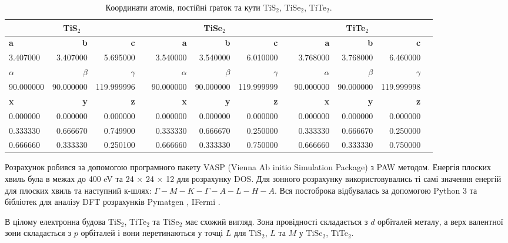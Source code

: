 \begin{table}[!htp]\centering

\scriptsize
\begin{tabular}{lrrrrrrrrrrr}\toprule
\multicolumn{3}{c}{\textbf{TiS$_2$}} & &\multicolumn{3}{c}{\textbf{TiSe$_2$}} & &\multicolumn{3}{c}{\textbf{TiTe$_2$}} \\\midrule
\textbf{a} &\textbf{b} &\textbf{c} & &\textbf{a} &\textbf{b} &\textbf{c} & &\textbf{a} &\textbf{b} &\textbf{c} \\
3.407000 &3.407000 &5.695000 & &3.540000 &3.540000 &6.010000 & &3.768000 &3.768000 &6.460000 \\
\textbf{$\alpha$} &\textbf{$\beta$} &\textbf{$\gamma$} & &\textbf{$\alpha$} &\textbf{$\beta$} &\textbf{$\gamma$} & &\textbf{$\alpha$} &\textbf{$\beta$} &\textbf{$\gamma$} \\
90.000000 &90.000000 &119.999996 & &90.000000 &90.000000 &119.999999 & &90.000000 &90.000000 &119.999998 \\
\textbf{x} &\textbf{y} &\textbf{z} & &\textbf{x} &\textbf{y} &\textbf{z} & &\textbf{x} &\textbf{y} &\textbf{z} \\
0.000000 &0.000000 &0.000000 & &0.000000 &0.000000 &0.000000 & &0.000000 &0.000000 &0.000000 \\
0.333330 &0.666670 &0.749900 & &0.333330 &0.666670 &0.250000 & &0.333330 &0.666670 &0.250000 \\
0.666660 &0.333330 &0.250100 & &0.666660 &0.333330 &0.750000 & &0.666660 &0.333330 &0.750000 \\
\bottomrule
\end{tabular}
\caption{Координати атомів, постійні ґраток та кути TiS$_2$, TiSe$_2$, TiTe$_2$.}\label{tab:Structure}
\end{table}

Розрахунок робився за допомогою програмного пакету VASP (Vienna Ab initio Simulation Package) \cite{VASP1,VASP2, VASP3, VASP4} з PAW методом. Енергія плоских хвиль була в межах до 400 eV та 24 $\times$ 24 $\times$ 12 для розрахунку DOS. Для зонного розрахунку використовувались ті самі значення енергій для плоских хвиль та наступний к-шлях: $\Gamma-M-K-\Gamma-A-L-H-A$.
Вся постоброка відбувалась за допомогою Python 3 \cite{Python} та бібліотек для аналізу DFT розрахунків Pymatgen \cite{PyMatgen}, IFermi \cite{Ifermi}. 

В цілому електронна будова TiS$_2$, TiTe$_2$ та TiSe$_2$ має схожий вигляд. Зона провідності складається з $d$ орбіталей металу, а верх валентної зони складається з $p$ орбіталей і вони перетинаються у точці $L$ для TiS$_2$, $L$ та $M$ у TiSe$_2$, TiTe$_2$. 

